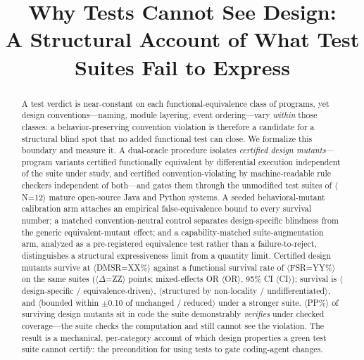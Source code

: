 \documentclass[conference]{IEEEtran}
\newcommand{\ph}[1]{\colorbox{yellow!35}{\small$\langle$\textsf{#1}$\rangle$}}
\begin{document}
\title{Why Tests Cannot See Design:\\A Structural Account of What Test Suites Fail to Express}

\author{
}

\maketitle

\begin{abstract}
A test verdict is near-constant on each functional-equivalence class of programs, yet design conventions---naming, module layering, event ordering---vary \emph{within} those classes: a behavior-preserving convention violation is therefore a candidate for a structural blind spot that no added functional test can close. We formalize this boundary and measure it. A dual-oracle procedure isolates \emph{certified design mutants}---program variants certified functionally equivalent by differential execution independent of the suite under study, and certified convention-violating by machine-readable rule checkers independent of both---and gates them through the unmodified test suites of \ph{N=12} mature open-source Java and Python systems. A seeded behavioral-mutant calibration arm attaches an empirical false-equivalence bound to every survival number; a matched convention-neutral control separates design-specific blindness from the generic equivalent-mutant effect; and a capability-matched suite-augmentation arm, analyzed as a pre-registered equivalence test rather than a failure-to-reject, distinguishes a structural expressiveness limit from a quantity limit. Certified design mutants survive at \ph{DMSR=XX\%} against a functional survival rate of \ph{FSR=YY\%} on the same suites (\ph{$\Delta$=ZZ} points; mixed-effects OR \ph{OR}, 95\% CI \ph{CI}); survival is \ph{design-specific / equivalence-driven}, \ph{structured by non-locality / undifferentiated}, and \ph{bounded within $\pm$0.10 of unchanged / reduced} under a stronger suite. \ph{PP\%} of surviving design mutants sit in code the suite demonstrably \emph{verifies} under checked coverage---the suite checks the computation and still cannot see the violation. The result is a mechanical, per-category account of which design properties a green test suite cannot certify: the precondition for using tests to gate coding-agent changes.
\end{abstract}
\end{document}
